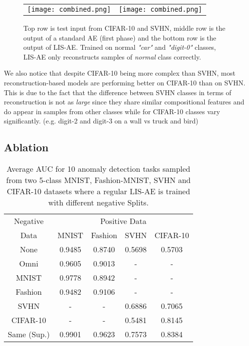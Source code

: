 \documentclass[acmtog, nonacm]{acmart}
\begin{document}
\begin{figure}
    \begin{tabular}{ll}
     \texttt{[image: combined.png]}&
     \texttt{[image: combined.png]}
\end{tabular}
    
    \caption{Top row is test input from CIFAR-10 and SVHN, middle row is the output of a standard AE (first phase) and the bottom row is the output of LIS-AE. Trained on normal \textit{"car"} and \textit{"digit-0"} classes, LIS-AE only reconstructs samples of \textit{normal} class correctly.}
    
    \label{fig:cifar10_fig}
\end{figure}


We also notice that despite CIFAR-10 being more complex than SVHN, most reconstruction-based models are performing better on CIFAR-10 than on SVHN. This is due to the fact that the difference between SVHN classes in terms of reconstruction is not as \textit{large} since they share similar compositional features and do appear in samples from other classes while for CIFAR-10 classes vary significantly. (e.g. digit-2 and digit-3 on a wall vs truck and bird)  

\subsection{Ablation}


\begin{table}[]
\caption{Average AUC for 10 anomaly detection tasks sampled from two 5-class MNIST, Fashion-MNIST, SVHN and CIFAR-10 datasets where a regular LIS-AE is trained with different negative Splits.
}


\begin{tabular}{@{}c|cccc@{}}
\midrule
Negative & \multicolumn{4}{c}{Positive   Data} \\
\hspace{.25em}Data & MNIST & Fashion & SVHN & CIFAR-10 \\
\midrule
None     & 0.9485  & 0.8740   & 0.5698 & 0.5703        \\
Omni     & 0.9605  & 0.9013   &   -   &   -       \\
MNIST    & 0.9778  & 0.8942   &   -   &   -        \\
Fashion  & 0.9482  & 0.9106   &   -   &   -         \\
\midrule
SVHN &    -   &     -    &0.6886            &0.7065         \\
CIFAR-10& -  &   - & 0.5481              & 0.8145        \\
\midrule
Same (Sup.)&0.9901    &0.9623    & 0.7573 & 0.8384  \\

\midrule
\end{tabular}
\end{table}
\end{document}
